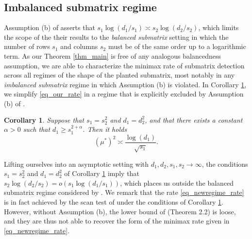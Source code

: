 \documentclass{article}
\newcommand{\ju}[1]{{\color{purple}Julien: #1}}
\newcommand{\pa}[1]{{\color{red}Parker: #1}}
\newtheorem{corollary}{Corollary}
\theoremstyle{remark}
\begin{document}
    \subsection{Imbalanced submatrix regime}\label{sec_imbalanced}

    Assumption (b) of \citet{butucea2013detection} asserts that $s_1 \log(d_1/s_1) \asymp s_2 \log(d_2/s_2)$, which limits the scope of the their results to the \textit{balanced submatrix} setting in which the number of rows $s_1$ and columns $s_2$ must be of the same order up to a logarithmic term. As our Theorem \ref{thm_main} is free of any analogous balancedness assumption, we are able to characterize the minimax rate of submatrix detection across all regimes of the shape of the planted submatrix, most notably in any \textit{imbalanced submatrix} regime in which Assumption (b) is violated. In Corollary \ref{cor_simplify_newregime}, we simplify \eqref{eq_our_rate} in a regime that is explicitly excluded by Assumption (b) of \cite{butucea2013detection}.%
\begin{corollary}\label{cor_simplify_newregime}
        Suppose that $s_1 = s_2^2$ and $d_1 = d_2^2$, and that there exists a constant $\alpha > 0$ such that $d_1 \geq s_1^{2 + \alpha}$. Then it holds
       \begin{equation}\label{eq_newregime_rate}
            (\mu^*)^2 \asymp \frac{\log \left(d_1\right)}{\sqrt{s_1}}.
        \end{equation}
    \end{corollary}
    Lifting ourselves into an asymptotic setting with $d_1, d_2, s_1, s_2 \rightarrow \infty$, the conditions $s_1 = s_2^2$ and $d_1 = d_2^2$ of Corollary \ref{cor_simplify_newregime} imply that $s_2\log(d_2/s_2) = o(s_1\log(d_1/s_1))$, which places us outside the balanced submatrix regime considered by \cite{butucea2013detection}. We remark that the rate \eqref{eq_newregime_rate} is in fact achieved by the scan test of \citet{butucea2013detection} under the conditions of Corollary \ref{cor_simplify_newregime}. However, without Assumption (b), the lower bound of \citet{butucea2013detection} (Theorem 2.2) is loose, and they are thus not able to recover the form of the minimax rate given in \eqref{eq_newregime_rate}.
\end{document}
